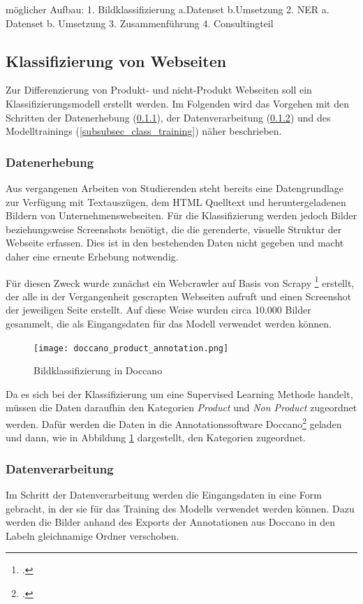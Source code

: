 möglicher Aufbau:
1.	Bildklassifizierung
	a.Datenset
	b.Umsetzung
2.	NER
	a.	Datenset
	b.	Umsetzung
3.	Zusammenführung
4.	Consultingteil

\subsection{Klassifizierung von Webseiten} \label{subsec_klassifierung_websites}
Zur Differenzierung von Produkt- und nicht-Produkt Webseiten soll ein Klassifizierungsmodell erstellt werden.
Im Folgenden wird das Vorgehen mit den Schritten der Datenerhebung (\ref{subsubsec_class_datenerhebung}), der Datenverarbeitung (\ref{subsubsec_class_datenverarbeitung}) und des Modelltrainings (\ref{subsubsec_class_training}) näher beschrieben.
\subsubsection{Datenerhebung} \label{subsubsec_class_datenerhebung}
Aus vergangenen Arbeiten von Studierenden steht bereits eine Datengrundlage zur Verfügung mit Textauszügen, dem HTML Quelltext und heruntergeladenen Bildern von Unternehmenswebseiten.
Für die Klassifizierung werden jedoch Bilder beziehungsweise Screenshots benötigt, die die gerenderte, visuelle Struktur der Webseite erfassen.
Dies ist in den bestehenden Daten nicht gegeben und macht daher eine erneute Erhebung notwendig.

Für diesen Zweck wurde zunächst ein Webcrawler auf Basis von Scrapy \footcite[\vglf][]{zotero-328} erstellt, der alle in der Vergangenheit gescrapten Webseiten aufruft und einen Screenshot der jeweiligen Seite erstellt.
Auf diese Weise wurden circa 10.000 Bilder gesammelt, die als Eingangsdaten für das Modell verwendet werden können.

\begin{figure}[H]
    \centering
    \caption[]{Bildklassifizierung in Doccano}
	\label{fig:doccano_products}
    \texttt{[image: doccano\_product\_annotation.png]}
\end{figure}
Da es sich bei der Klassifizierung um eine Supervised Learning Methode handelt, müssen die Daten daraufhin den Kategorien \textit{Product} und \textit{Non Product} zugeordnet werden.
Dafür werden die Daten in die Annotationssoftware Doccano\footcite[\vglf][]{doccano-2018} geladen und dann, wie in Abbildung \ref{fig:doccano_products} dargestellt, den Kategorien zugeordnet.

\subsubsection{Datenverarbeitung} \label{subsubsec_class_datenverarbeitung}
Im Schritt der Datenverarbeitung werden die Eingangsdaten in eine Form gebracht, in der sie für das Training des Modells verwendet werden können.
Dazu werden die Bilder anhand des Exports der Annotationen aus Doccano in den Labeln gleichnamige Ordner verschoben.

